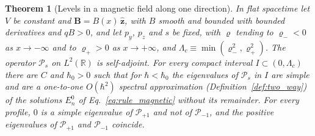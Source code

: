 \documentclass[aps,prd,onecolumn,tightenlines,nofootinbib,notitlepage,11pt,floatfix]{revtex4-2}
\theoremstyle{indentedtheorem}
\newtheorem{theorem}{Theorem}
\begin{document}
\begin{theorem}[Levels in a magnetic field along one direction]
\label{thm:levels_B}
In flat spacetime let $V$ be constant and $\mathbf{B}=B(x)\,\hat{\mathbf{z}}$, with $B$ smooth and bounded with bounded derivatives and $qB>0$, and let $p_y$, $p_z$ and $s$ be fixed, with $\varrho$ tending to $\varrho_-<0$ as $x\to-\infty$ and to $\varrho_+>0$ as $x\to+\infty$, and $\Lambda_c\equiv\min(\varrho_-^2,\varrho_+^2)$. The operator $\mathcal{P}_s$ on $L^2(\mathbb{R})$ is self-adjoint. For every compact interval $I\subset(0,\Lambda_c)$ there are $C$ and $\hbar_0>0$ such that for $\hbar<\hbar_0$ the eigenvalues of $\mathcal{P}_s$ in $I$ are simple and are a one-to-one $O(\hbar^2)$ spectral approximation (Definition~\ref{def:two_way}) of the solutions $E_n^0$ of Eq.~\eqref{eq:rule_magnetic} without its remainder. For every profile, $0$ is a simple eigenvalue of $\mathcal{P}_{+1}$ and not of $\mathcal{P}_{-1}$, and the positive eigenvalues of $\mathcal{P}_{+1}$ and $\mathcal{P}_{-1}$ coincide.
\end{theorem}
\end{document}
